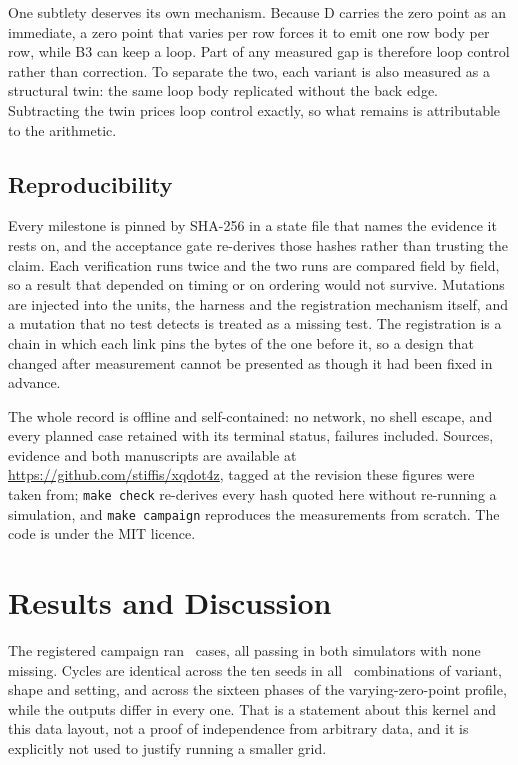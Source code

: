 One subtlety deserves its own mechanism. Because D carries the zero point as an
immediate, a zero point that varies per row forces it to emit one row body per
row, while B3 can keep a loop. Part of any measured gap is therefore loop
control rather than correction. To separate the two, each variant is also
measured as a structural twin: the same loop body replicated without the back
edge. Subtracting the twin prices loop control exactly, so what remains is
attributable to the arithmetic.

\subsection{Reproducibility}
Every milestone is pinned by SHA-256 in a state file that names the evidence it
rests on, and the acceptance gate re-derives those hashes rather than trusting
the claim. Each verification runs twice and the two runs are compared field by
field, so a result that depended on timing or on ordering would not survive.
Mutations are injected into the units, the harness and the registration
mechanism itself, and a mutation that no test detects is treated as a missing
test. The registration is a chain in which each link pins the bytes of the one
before it, so a design that changed after measurement cannot be presented as
though it had been fixed in advance.

The whole record is offline and self-contained: no network, no shell escape, and
every planned case retained with its terminal status, failures included. Sources,
evidence and both manuscripts are available at
\url{https://github.com/stiffis/xqdot4z}, tagged at the revision these figures
were taken from; \texttt{make check} re-derives every hash quoted here without
re-running a simulation, and \texttt{make campaign} reproduces the measurements
from scratch. The code is under the MIT licence.

\balance
\section{Results and Discussion}
The registered campaign ran \CampaignCases\ cases, all passing in both
simulators with none missing. Cycles are identical across the ten seeds in all
\CampaignCombos\ combinations of variant, shape and setting, and across the
sixteen phases of the varying-zero-point profile, while the outputs differ in
every one. That is a statement about this kernel and this data layout, not a
proof of independence from arbitrary data, and it is explicitly not used to
justify running a smaller grid.

